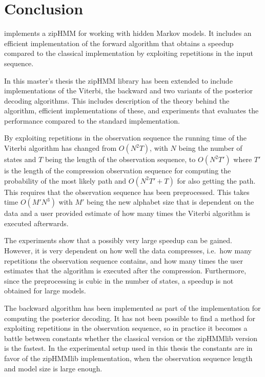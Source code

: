 \chapter{Conclusion}
\label{cha:conclusion}

\citet{sand2013ziphmmlib} implements a zipHMM for working
with hidden Markov models. It includes an efficient implementation of the forward
algorithm that obtains a speedup compared to the classical implementation by
exploiting repetitions in the input sequence.

In this master's thesis the zipHMM library has been extended to include
implementations of the Viterbi, the backward and two variants of the posterior
decoding algorithms. This includes description of the theory behind the
algorithm, efficient implementations of these, and experiments that evaluates
the performance compared to the standard implementation.

By exploiting repetitions in the observation sequence the running time of the
Viterbi algorithm has changed from $O(N^2 T)$, with $N$ being the number of
states and $T$ being the length of the observation sequence, to $O(N^2 T')$
where $T'$ is the length of the compression observation sequence for computing
the probability of the most likely path and $O(N^2 T' + T)$ for also getting
the path. This requires that the observation sequence has been preprocessed.
This takes time $O(M' N^3)$ with $M'$ being the new alphabet size that is
dependent on the data and a user provided estimate of how many times the
Viterbi algorithm is executed afterwards.

The experiments show that a possibly very large speedup can be gained. However,
it is very dependent on how well the data compresses, i.e.\ how many repetitions
the observation sequence contains, and how many times the user estimates that the
algorithm is executed after the compression. Furthermore, since the
preprocessing is cubic in the number of states, a speedup is not obtained for
large models.

The backward algorithm has been implemented as part of the implementation for
computing the posterior decoding. It has not been possible to find a method for
exploiting repetitions in the observation sequence, so in practice it becomes a
battle between constants whether the classical version or the zipHMMlib version
is the fastest. In the experimental setup used in this thesis the constants are
in favor of the zipHMMlib implementation, when the observation sequence length and
model size is large enough.

